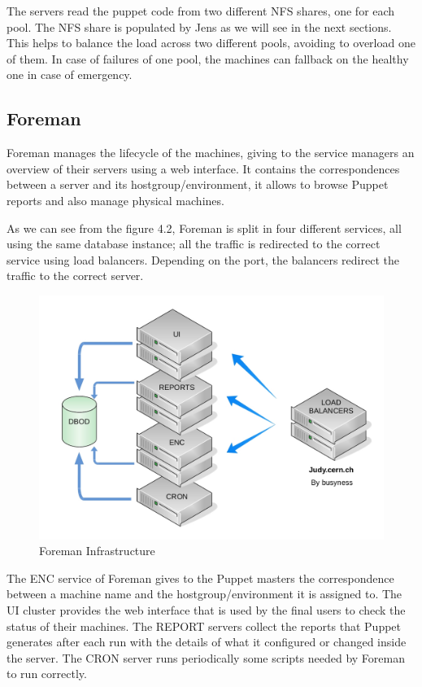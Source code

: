 The servers read the puppet code from two different NFS shares, one for
each pool. The NFS share is populated by Jens \cite{JensWebsite} as we
will see in the next sections. This helps to balance the load across two
different pools, avoiding to overload one of them. In case of failures of
one pool, the machines can fallback on the healthy one in case of
emergency. 

\subsection{Foreman}

Foreman manages the lifecycle of the machines, giving to the service
managers an overview of their servers using a web interface. It contains
the correspondences between a server and its hostgroup/environment, it
allows to browse Puppet reports and also manage physical machines.

As we can see from the figure 4.2, Foreman is split in four different
services, all using the same database instance; all the traffic is
redirected to the correct service using load balancers. Depending on the
port, the balancers redirect the traffic to the correct server.

\begin{figure}[H]
\includegraphics[width=\textwidth,height=\textheight,keepaspectratio]{ConfigurationManagement/Infrastructure_judy.jpg}
\caption{Foreman Infrastructure}
\end{figure}

The ENC service of Foreman gives to the Puppet masters the correspondence
between a machine name and the hostgroup/environment it is assigned to. The UI
cluster provides the web interface that is used by the final users to check the
status of their machines. The REPORT servers collect the reports that Puppet
generates after each run with the details of what it configured or changed
inside the server. The CRON server runs periodically some scripts needed by
Foreman to run correctly.

